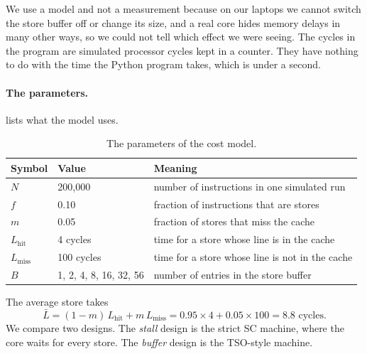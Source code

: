 We use a model and not a measurement because on our laptops we cannot switch the store buffer off or change its size, and a real core hides memory delays in many other ways, so we could not tell which effect we were seeing. The cycles in the program are simulated processor cycles kept in a counter. They have nothing to do with the time the Python program takes, which is under a second.

\paragraph{The parameters.}  lists what the model uses.

\begin{table}[!htbp]
\centering\small
\caption{The parameters of the cost model.}
\label{tab:cpiparams}
\begin{tabularx}{\textwidth}{@{}llX@{}}
\toprule
Symbol & Value & Meaning\\
\midrule
$N$ & 200{,}000 & number of instructions in one simulated run\\
$f$ & 0.10 & fraction of instructions that are stores\\
$m$ & 0.05 & fraction of stores that miss the cache\\
$L_{\text{hit}}$ & 4 cycles & time for a store whose line is in the cache\\
$L_{\text{miss}}$ & 100 cycles & time for a store whose line is not in the cache\\
$B$ & 1, 2, 4, 8, 16, 32, 56 & number of entries in the store buffer\\
\bottomrule
\end{tabularx}
\end{table}

The average store takes
\[
\bar{L} = (1 - m)\,L_{\text{hit}} + m\,L_{\text{miss}} = 0.95 \times 4 + 0.05 \times 100 = 8.8 \text{ cycles.}
\]
We compare two designs. The \emph{stall} design is the strict SC machine, where the core waits for every store. The \emph{buffer} design is the TSO-style machine.

